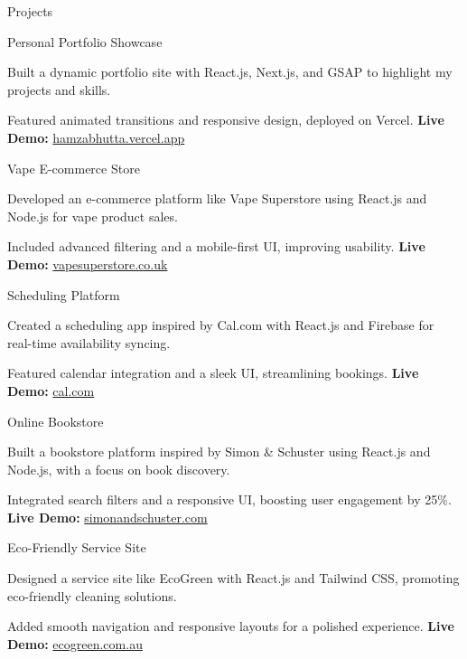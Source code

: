 \documentclass{resume}
\begin{document}
\begin{rSection}{Projects}

\begin{rSubsection}{Personal Portfolio Showcase}{}{}{}
\item Built a dynamic portfolio site with React.js, Next.js, and GSAP to highlight my projects and skills.
\item Featured animated transitions and responsive design, deployed on Vercel. \textbf{Live Demo:} \href{https://hamzabhutta.vercel.app}{hamzabhutta.vercel.app}
\end{rSubsection}

\begin{rSubsection}{Vape E-commerce Store}{}{}{}
\item Developed an e-commerce platform like Vape Superstore using React.js and Node.js for vape product sales.
\item Included advanced filtering and a mobile-first UI, improving usability. \textbf{Live Demo:} \href{https://www.vapesuperstore.co.uk}{vapesuperstore.co.uk}
\end{rSubsection}

\begin{rSubsection}{Scheduling Platform}{}{}{}
\item Created a scheduling app inspired by Cal.com with React.js and Firebase for real-time availability syncing.
\item Featured calendar integration and a sleek UI, streamlining bookings. \textbf{Live Demo:} \href{https://cal.com}{cal.com}
\end{rSubsection}

\begin{rSubsection}{Online Bookstore}{}{}{}
\item Built a bookstore platform inspired by Simon \& Schuster using React.js and Node.js, with a focus on book discovery.
\item Integrated search filters and a responsive UI, boosting user engagement by 25\%. \textbf{Live Demo:} \href{https://www.simonandschuster.com}{simonandschuster.com}
\end{rSubsection}
  
\begin{rSubsection}{Eco-Friendly Service Site}{}{}{}
\item Designed a service site like EcoGreen with React.js and Tailwind CSS, promoting eco-friendly cleaning solutions.
\item Added smooth navigation and responsive layouts for a polished experience. \textbf{Live Demo:} \href{https://ecogreen.com.au}{ecogreen.com.au}
\end{rSubsection}



\end{rSection}
\end{document}
